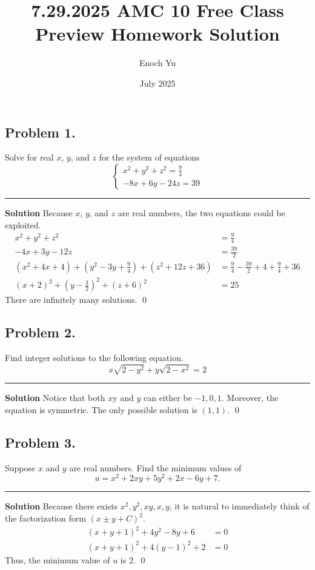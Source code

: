 \documentclass{article}
\title{7.29.2025 AMC 10 Free Class Preview Homework Solution}
\author{Enoch Yu}
\date{July 2025}
\newenvironment{solution}{\begin{trivlist}\item[]{\bf Solution}}{\qed \end{trivlist}}
\newcommand{\MyLine}{\noindent\rule{0.99\textwidth}{0.4pt}}
\begin{document}
\maketitle

\subsection*{Problem 1.}
{\color {Gray}
Solve for real $x$, $y$, and $z$ for the system of equations
\[
\begin{cases}
x^2 + y^2 + z^2 = \frac{9}{4} \\
-8x + 6y - 24z = 39
\end{cases}
\]
}
\MyLine
\begin{solution}
Because $x$, $y$, and $z$ are real numbers, the two equations
could be exploited.
\begin{align*}
    x^2 + y^2 + z^2 &= \frac{9}{4} \\
    -4x +  3y - 12z &= \frac{39}{2} \\
    \left( x^2 + 4x + 4 \right)
        + \left( y^2 - 3y + \frac{9}{4} \right)
        + \left( z^2 + 12z + 36 \right)
    &= \frac{9}{4} - \frac{39}{2} + 4 + \frac{9}{4} + 36 \\
    (x + 2)^2 + \left( y - \frac{3}{2} \right)^2 + (z + 6)^2
    &= 25
\end{align*}
There are infinitely many solutions.
\end{solution}

\subsection*{Problem 2.}
{\color {Gray}
Find integer solutions to the following equation.
\[
x\sqrt{2 - y^2} + y\sqrt{2 - x^2} = 2
\]
}
\MyLine
\begin{solution}
Notice that both $x$y and $y$ can either be $-1, 0, 1$.
Moreover, the equation is symmetric. The only possible
solution is $\boxed{(1, 1)}$.
\end{solution}

\subsection*{Problem 3.}
{\color {Gray}
Suppose $x$ and $y$ are real numbers. Find the minimum values of
\[
u = x^2 + 2xy + 5y^2 + 2x - 6y + 7.
\]
}
\MyLine
\begin{solution}
Because there exists $x^2, y^2, xy, x, y$, it is natural
to immediately think of the factorization form $(x \pm y + C)^2$.
\begin{align*}
    (x + y + 1)^2 + 4y^2 - 8y + 6 &= 0 \\
    (x + y + 1)^2 + 4(y - 1)^2 + 2 &= 0
\end{align*}
Thus, the minimum value of $u$ is $\boxed{2}$.
\end{solution}
\end{document}
